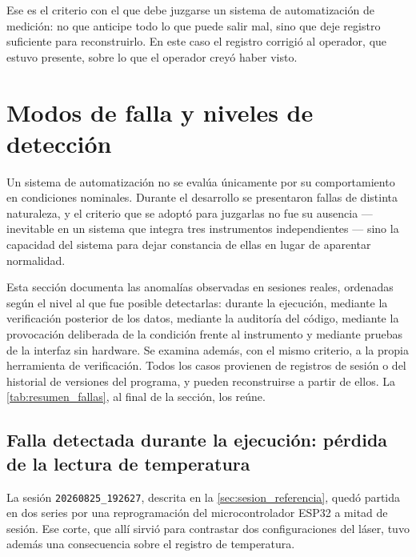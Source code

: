 Ese es el criterio con el que debe juzgarse un sistema de
automatización de medición: no que anticipe todo lo que puede salir
mal, sino que deje registro suficiente para reconstruirlo. En este
caso el registro corrigió al operador, que estuvo presente, sobre lo
que el operador creyó haber visto.



\section{Modos de falla y niveles de detección}
\label{sec:fallas}

Un sistema de automatización no se evalúa únicamente por su
comportamiento en condiciones nominales. Durante el desarrollo se
presentaron fallas de distinta naturaleza, y el criterio que se adoptó
para juzgarlas no fue su ausencia --- inevitable en un sistema que
integra tres instrumentos independientes --- sino la capacidad del
sistema para dejar constancia de ellas en lugar de aparentar
normalidad.

Esta sección documenta las anomalías observadas en sesiones reales,
ordenadas según el nivel al que fue posible detectarlas: durante la
ejecución, mediante la verificación posterior de los datos, mediante la
auditoría del código, mediante la provocación deliberada de la
condición frente al instrumento y mediante pruebas de la interfaz sin
hardware. Se examina además, con el mismo criterio, a
la propia herramienta de verificación. Todos los casos provienen de
registros de sesión o del historial de versiones del programa, y pueden
reconstruirse a partir de ellos. La \cref{tab:resumen_fallas}, al final
de la sección, los reúne.

\subsection{Falla detectada durante la ejecución: pérdida de la lectura
de temperatura}
\label{sec:falla_temperatura}

La sesión \texttt{20260825\_192627}, descrita en la
\cref{sec:sesion_referencia}, quedó partida en dos series por una
reprogramación del microcontrolador ESP32 a mitad de sesión. Ese corte,
que allí sirvió para contrastar dos configuraciones del láser, tuvo
además una consecuencia sobre el registro de temperatura.


